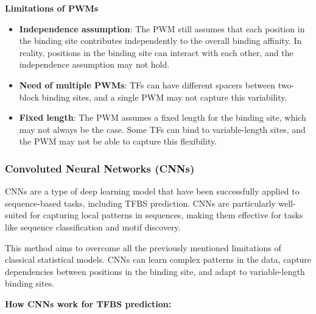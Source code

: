 \documentclass[a4paper]{article}
\begin{document}
\textbf{Limitations of PWMs}

\begin{itemize}
    \item \textbf{Independence assumption}: The PWM still assumes that each position
    in the binding site contributes independently to the overall binding affinity.
    In reality, positions in the binding site can interact with each other, and
    the independence assumption may not hold.
    
    \item \textbf{Need of multiple PWMs}: TFs can have different spacers between
    two-block binding sites, and a single PWM may not capture this variability.

    \item \textbf{Fixed length}: The PWM assumes a fixed length for the binding
    site, which may not always be the case. Some TFs can bind to variable-length
    sites, and the PWM may not be able to capture this flexibility.

\end{itemize}

\subsubsection*{Convoluted Neural Networks (CNNs)}

CNNs are a type of deep learning model that have been successfully applied to
sequence-based tasks, including TFBS prediction. CNNs are particularly well-suited
for capturing local patterns in sequences, making them effective for tasks like
sequence classification and motif discovery.

This method aims to overcome all the previously mentioned limitations of classical
statistical models. CNNs can learn complex patterns in the data, capture dependencies
between positions in the binding site, and adapt to variable-length binding sites.

\textbf{How CNNs work for TFBS prediction:}
\end{document}
